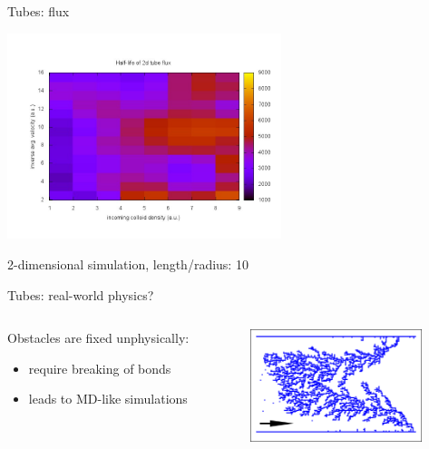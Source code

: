 \documentclass[smaller]{beamer}
\begin{document}
            \begin{frame}{Tubes: flux}
                \begin{center}
                    \includegraphics[width=8cm]{img/tube_04.jpg}

                    \color{gray}
                    2-dimensional simulation, length/radius: 10
                \end{center}
            \end{frame}

            \begin{frame}{Tubes: real-world physics?}
                \begin{columns}
                    \begin{column}{5cm}
                        Obstacles are fixed unphysically:
                        \begin{itemize}
                            \item require breaking of bonds
                            \item leads to MD-like simulations
                        \end{itemize}
                    \end{column}
                    \begin{column}{5cm}
                        \includegraphics[width=5cm]{img/tube_05.png}
                    \end{column}
               \end{columns} 
            \end{frame}
\end{document}
